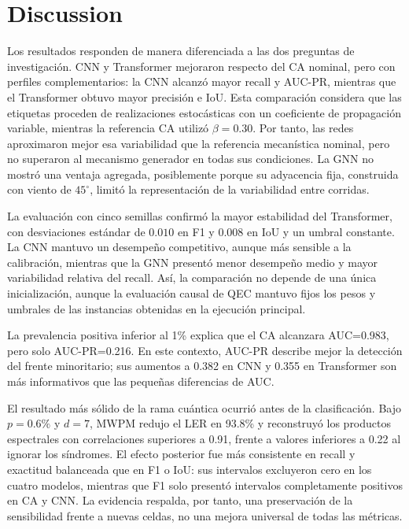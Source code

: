 \documentclass[fleqn,10pt]{wlscirep}
\begin{document}
\section*{Discussion}

Los resultados responden de manera diferenciada a las dos preguntas de investigación. CNN y Transformer mejoraron respecto del CA nominal, pero con perfiles complementarios: la CNN alcanzó mayor recall y AUC-PR, mientras que el Transformer obtuvo mayor precisión e IoU. Esta comparación considera que las etiquetas proceden de realizaciones estocásticas con un coeficiente de propagación variable, mientras la referencia CA utilizó $\beta=0.30$. Por tanto, las redes aproximaron mejor esa variabilidad que la referencia mecanística nominal, pero no superaron al mecanismo generador en todas sus condiciones. La GNN no mostró una ventaja agregada, posiblemente porque su adyacencia fija, construida con viento de $45^\circ$, limitó la representación de la variabilidad entre corridas.

La evaluación con cinco semillas confirmó la mayor estabilidad del Transformer, con desviaciones estándar de $0.010$ en F1 y $0.008$ en IoU y un umbral constante. La CNN mantuvo un desempeño competitivo, aunque más sensible a la calibración, mientras que la GNN presentó menor desempeño medio y mayor variabilidad relativa del recall. Así, la comparación no depende de una única inicialización, aunque la evaluación causal de QEC mantuvo fijos los pesos y umbrales de las instancias obtenidas en la ejecución principal.

La prevalencia positiva inferior al 1\% explica que el CA alcanzara AUC=0.983, pero solo AUC-PR=0.216. En este contexto, AUC-PR describe mejor la detección del frente minoritario; sus aumentos a 0.382 en CNN y 0.355 en Transformer son más informativos que las pequeñas diferencias de AUC.

El resultado más sólido de la rama cuántica ocurrió antes de la clasificación. Bajo $p=0.6\%$ y $d=7$, MWPM redujo el LER en 93.8\% y reconstruyó los productos espectrales con correlaciones superiores a 0.91, frente a valores inferiores a 0.22 al ignorar los síndromes. El efecto posterior fue más consistente en recall y exactitud balanceada que en F1 o IoU: sus intervalos excluyeron cero en los cuatro modelos, mientras que F1 solo presentó intervalos completamente positivos en CA y CNN. La evidencia respalda, por tanto, una preservación de la sensibilidad frente a nuevas celdas, no una mejora universal de todas las métricas.
\end{document}
